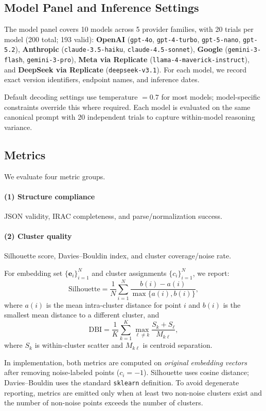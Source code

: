 \documentclass[11pt]{article}
\begin{document}
\subsection{Model Panel and Inference Settings}
The model panel covers 10 models across 5 provider families, with 20 trials per model (200 total; 193 valid): \textbf{OpenAI} (\texttt{gpt-4o}, \texttt{gpt-4-turbo}, \texttt{gpt-5-nano}, \texttt{gpt-5.2}), \textbf{Anthropic} (\texttt{claude-3.5-haiku}, \texttt{claude-4.5-sonnet}), \textbf{Google} (\texttt{gemini-3-flash}, \texttt{gemini-3-pro}), \textbf{Meta via Replicate} (\texttt{llama-4-maverick-instruct}), and \textbf{DeepSeek via Replicate} (\texttt{deepseek-v3.1}). For each model, we record exact version identifiers, endpoint names, and inference dates.

Default decoding settings use temperature $=0.7$ for most models; model-specific constraints override this where required. Each model is evaluated on the same canonical prompt with 20 independent trials to capture within-model reasoning variance.

\subsection{Metrics}
We evaluate four metric groups.

\paragraph{(1) Structure compliance}
JSON validity, IRAC completeness, and parse/normalization success.

\paragraph{(2) Cluster quality}
Silhouette score, Davies--Bouldin index, and cluster coverage/noise rate.

For embedding set $\{\mathbf{e}_i\}_{i=1}^N$ and cluster assignments $\{c_i\}_{i=1}^N$, we report:
\[
\mathrm{Silhouette} = \frac{1}{N}\sum_{i=1}^{N}\frac{b(i)-a(i)}{\max\{a(i),b(i)\}},
\]
where $a(i)$ is the mean intra-cluster distance for point $i$ and $b(i)$ is the smallest mean distance to a different cluster, and
\[
\mathrm{DBI} = \frac{1}{K}\sum_{k=1}^{K}\max_{\ell\neq k}\frac{S_k+S_\ell}{M_{k\ell}},
\]
where $S_k$ is within-cluster scatter and $M_{k\ell}$ is centroid separation.

In implementation, both metrics are computed on \emph{original embedding vectors} after removing noise-labeled points ($c_i=-1$). Silhouette uses cosine distance; Davies--Bouldin uses the standard \texttt{sklearn} definition. To avoid degenerate reporting, metrics are emitted only when at least two non-noise clusters exist and the number of non-noise points exceeds the number of clusters.
\end{document}
